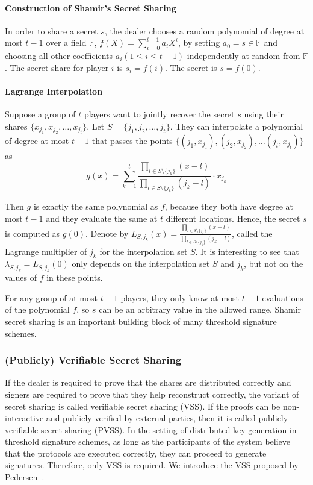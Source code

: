 \paragraph{Construction of Shamir's Secret Sharing} In order to share a secret $s$, the dealer chooses a random polynomial of degree at most $t-1$ over a field $\mathbb{F}$, $f(X)=\sum_{i=0}^{t-1} a_i X^i$, by setting $a_0=s\in \mathbb{F}$ and choosing all other coefficients $a_i(1\le i\le t-1)$ independently at random from $\mathbb{F}$. The secret share for player $i$ is $s_i = f(i)$. The secret is $s=f(0)$. 

\paragraph{Lagrange Interpolation} Suppose a group of $t$ players want to jointly recover the secret $s$ using their shares $\{x_{j_1}, x_{j_2},\dots, x_{j_t}\}$. Let $S = \{j_1, j_2, \dots, j_t\}$. They can interpolate a polynomial of degree at most $t-1$ that passes the points $\{(j_1, x_{j_1}), (j_2, x_{j_2}), \dots (j_t, x_{j_t})\}$ as
\begin{equation*} 
    g(x) = \sum_{k=1}^{t}\frac{\prod_{l \in S\setminus \{j_k\} } (x - l)}{\prod_{l \in S\setminus \{j_k\} } (j_k - l)}\cdot x_{j_k}   
\end{equation*}

\par Then $g$ is exactly the same polynomial as $f$, because they both have degree at most $t-1$ and they evaluate the same at $t$ different locations. Hence, the secret $s$ is computed as $g(0)$. Denote by $L_{S, j_k}(x) = \frac{\prod_{l \in S\setminus \{j_k\} } (x - l)}{\prod_{l \in S\setminus \{j_k\} } (j_k - l)}$, called the Lagrange multiplier of $j_k$ for the interpolation set $S$. It is interesting to see that $\lambda_{S, j_k} = L_{S, j_k}(0)$ only depends on the interpolation set $S$ and $j_k$, but not on the values of $f$ in these points.  

For any group of at most $t-1$ players, they only know at most $t-1$ evaluations of the polynomial $f$, so $s$ can be an arbitrary value in the allowed range. Shamir secret sharing is an important building block of many threshold signature schemes. 

\subsubsection{(Publicly) Verifiable Secret Sharing} \label{subsubsec:vss}
If the dealer is required to prove that the shares are distributed correctly and signers are required to prove that they help reconstruct correctly, the variant of secret sharing is called verifiable secret sharing (VSS). If the proofs can be non-interactive and publicly verified by external parties, then it is called publicly verifiable secret sharing (PVSS). In the setting of distributed key generation in threshold signature schemes, as long as the participants of the system believe that the protocols are executed correctly, they can proceed to generate signatures. Therefore, only VSS is required. We introduce the VSS proposed by Pedersen~\cite{DBLP:conf/crypto/Pedersen91}. 


